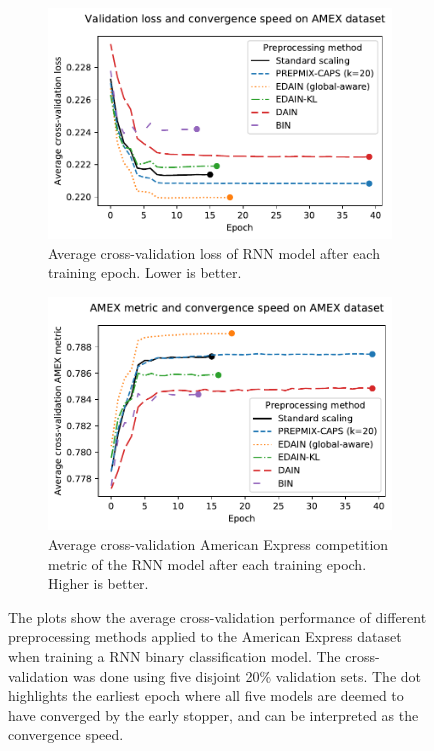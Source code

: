 \documentclass{statsmsc}
\begin{document}
{%
\begin{figure}[htp]
    \centering
    \begin{subfigure}[b]{0.99\textwidth}
        \centering
        \includegraphics[width=\textwidth]{figures/amex_performance_convergence.pdf}
        \caption{Average cross-validation loss of \ac{RNN} model after each training epoch.
        Lower is better.}
        \label{fig:amex_performance_loss}
    \end{subfigure}
    \hfill
    \begin{subfigure}[b]{0.99\textwidth}
        \centering
        \includegraphics[width=\textwidth]{figures/amex_performance_convergence_metric.pdf}
        \caption{Average cross-validation American Express competition metric of the \ac{RNN} model
        after each training epoch. Higher is better.}
        \label{fig:amex_performance_metric}
    \end{subfigure}
    \caption{
        The plots show the average cross-validation performance of different preprocessing methods
        applied to the American Express dataset when training a \ac{RNN} binary classification model.
        The cross-validation was done using five disjoint 20\% validation sets.
        The dot highlights the earliest epoch where all five models are deemed to have converged by
        the early stopper, and can be interpreted as the convergence speed.
    }%
    \label{fig:amex_performance}
\end{figure}

}
\end{document}
